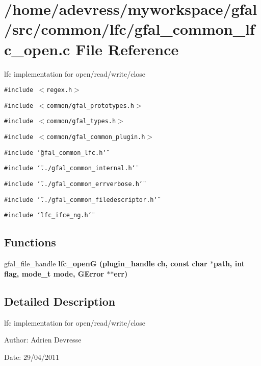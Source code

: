 \section{/home/adevress/myworkspace/gfal/src/common/lfc/gfal\_\-common\_\-lfc\_\-open.c File Reference}
\label{gfal__common__lfc__open_8c}
lfc implementation for open/read/write/close 

{\tt \#include $<$regex.h$>$}\par
{\tt \#include $<$common/gfal\_\-prototypes.h$>$}\par
{\tt \#include $<$common/gfal\_\-types.h$>$}\par
{\tt \#include $<$common/gfal\_\-common\_\-plugin.h$>$}\par
{\tt \#include \char`\"{}gfal\_\-common\_\-lfc.h\char`\"{}}\par
{\tt \#include \char`\"{}../gfal\_\-common\_\-internal.h\char`\"{}}\par
{\tt \#include \char`\"{}../gfal\_\-common\_\-errverbose.h\char`\"{}}\par
{\tt \#include \char`\"{}../gfal\_\-common\_\-filedescriptor.h\char`\"{}}\par
{\tt \#include \char`\"{}lfc\_\-ifce\_\-ng.h\char`\"{}}\par
\subsection*{Functions}
\begin{CompactItemize}
\item 
gfal\_\-file\_\-handle \bf{lfc\_\-open\-G} (plugin\_\-handle ch, const char $\ast$path, int flag, mode\_\-t mode, GError $\ast$$\ast$err)
\end{CompactItemize}


\subsection{Detailed Description}
lfc implementation for open/read/write/close 

\begin{Desc}
\item[Author:]Adrien Devresse \end{Desc}
\begin{Desc}
\item[Date:]29/04/2011 \end{Desc}


